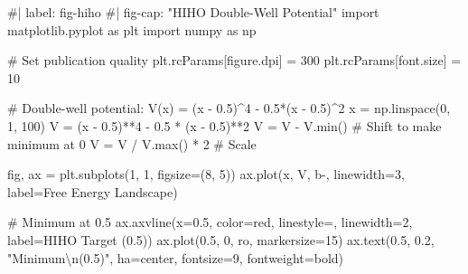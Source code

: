 \documentclass[
  letterpaper,
  DIV=11,
  numbers=noendperiod]{scrartcl}
\newenvironment{Shaded}{\begin{snugshade}}{\end{snugshade}}
\newcommand{\BuiltInTok}[1]{\textcolor[rgb]{0.00,0.23,0.31}{#1}}
\newcommand{\CharTok}[1]{\textcolor[rgb]{0.13,0.47,0.30}{#1}}
\newcommand{\CommentTok}[1]{\textcolor[rgb]{0.37,0.37,0.37}{#1}}
\newcommand{\DecValTok}[1]{\textcolor[rgb]{0.68,0.00,0.00}{#1}}
\newcommand{\FloatTok}[1]{\textcolor[rgb]{0.68,0.00,0.00}{#1}}
\newcommand{\ImportTok}[1]{\textcolor[rgb]{0.00,0.46,0.62}{#1}}
\newcommand{\NormalTok}[1]{\textcolor[rgb]{0.00,0.23,0.31}{#1}}
\newcommand{\OperatorTok}[1]{\textcolor[rgb]{0.37,0.37,0.37}{#1}}
\newcommand{\StringTok}[1]{\textcolor[rgb]{0.13,0.47,0.30}{#1}}
\begin{document}
\begin{Shaded}
\begin{Highlighting}[]
\CommentTok{\#| label: fig{-}hiho}
\CommentTok{\#| fig{-}cap: "HIHO Double{-}Well Potential"}
\ImportTok{import}\NormalTok{ matplotlib.pyplot }\ImportTok{as}\NormalTok{ plt}
\ImportTok{import}\NormalTok{ numpy }\ImportTok{as}\NormalTok{ np}

\CommentTok{\# Set publication quality}
\NormalTok{plt.rcParams[}\StringTok{\textquotesingle{}figure.dpi\textquotesingle{}}\NormalTok{] }\OperatorTok{=} \DecValTok{300}
\NormalTok{plt.rcParams[}\StringTok{\textquotesingle{}font.size\textquotesingle{}}\NormalTok{] }\OperatorTok{=} \DecValTok{10}

\CommentTok{\# Double{-}well potential: V(x) = (x {-} 0.5)\^{}4 {-} 0.5*(x {-} 0.5)\^{}2}
\NormalTok{x }\OperatorTok{=}\NormalTok{ np.linspace(}\DecValTok{0}\NormalTok{, }\DecValTok{1}\NormalTok{, }\DecValTok{100}\NormalTok{)}
\NormalTok{V }\OperatorTok{=}\NormalTok{ (x }\OperatorTok{{-}} \FloatTok{0.5}\NormalTok{)}\OperatorTok{**}\DecValTok{4} \OperatorTok{{-}} \FloatTok{0.5} \OperatorTok{*}\NormalTok{ (x }\OperatorTok{{-}} \FloatTok{0.5}\NormalTok{)}\OperatorTok{**}\DecValTok{2}
\NormalTok{V }\OperatorTok{=}\NormalTok{ V }\OperatorTok{{-}}\NormalTok{ V.}\BuiltInTok{min}\NormalTok{()  }\CommentTok{\# Shift to make minimum at 0}
\NormalTok{V }\OperatorTok{=}\NormalTok{ V }\OperatorTok{/}\NormalTok{ V.}\BuiltInTok{max}\NormalTok{() }\OperatorTok{*} \DecValTok{2}  \CommentTok{\# Scale}

\NormalTok{fig, ax }\OperatorTok{=}\NormalTok{ plt.subplots(}\DecValTok{1}\NormalTok{, }\DecValTok{1}\NormalTok{, figsize}\OperatorTok{=}\NormalTok{(}\DecValTok{8}\NormalTok{, }\DecValTok{5}\NormalTok{))}
\NormalTok{ax.plot(x, V, }\StringTok{\textquotesingle{}b{-}\textquotesingle{}}\NormalTok{, linewidth}\OperatorTok{=}\DecValTok{3}\NormalTok{, label}\OperatorTok{=}\StringTok{\textquotesingle{}Free Energy Landscape\textquotesingle{}}\NormalTok{)}

\CommentTok{\# Minimum at 0.5}
\NormalTok{ax.axvline(x}\OperatorTok{=}\FloatTok{0.5}\NormalTok{, color}\OperatorTok{=}\StringTok{\textquotesingle{}red\textquotesingle{}}\NormalTok{, linestyle}\OperatorTok{=}\StringTok{\textquotesingle{}{-}{-}\textquotesingle{}}\NormalTok{, linewidth}\OperatorTok{=}\DecValTok{2}\NormalTok{, label}\OperatorTok{=}\StringTok{\textquotesingle{}HIHO Target (0.5)\textquotesingle{}}\NormalTok{)}
\NormalTok{ax.plot(}\FloatTok{0.5}\NormalTok{, }\DecValTok{0}\NormalTok{, }\StringTok{\textquotesingle{}ro\textquotesingle{}}\NormalTok{, markersize}\OperatorTok{=}\DecValTok{15}\NormalTok{)}
\NormalTok{ax.text(}\FloatTok{0.5}\NormalTok{, }\FloatTok{0.2}\NormalTok{, }\StringTok{"Minimum}\CharTok{\textbackslash{}n}\StringTok{(0.5)"}\NormalTok{, ha}\OperatorTok{=}\StringTok{\textquotesingle{}center\textquotesingle{}}\NormalTok{, fontsize}\OperatorTok{=}\DecValTok{9}\NormalTok{, fontweight}\OperatorTok{=}\StringTok{\textquotesingle{}bold\textquotesingle{}}\NormalTok{)}


\end{Highlighting}
\end{Shaded}
\end{document}
